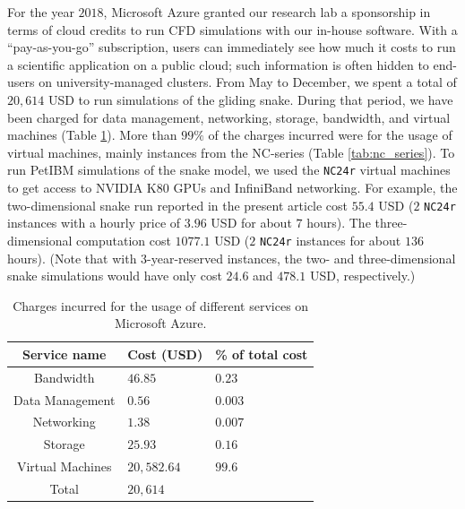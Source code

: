 \documentclass[10pt,journal,compsoc]{IEEEtran}
\begin{document}
For the year $2018$, Microsoft Azure granted our research lab a sponsorship in terms of cloud credits to run CFD simulations with our in-house software.
With a ``pay-as-you-go'' subscription, users can immediately see how much it costs to run a scientific application on a public cloud; such information is often hidden to end-users on university-managed clusters.
From May to December, we spent a total of $20,614$ USD to run simulations of the gliding snake.
During that period, we have been charged for data management, networking, storage, bandwidth, and virtual machines (Table \ref{tab:azure_charges}).
More than $99\%$ of the charges incurred were for the usage of virtual machines, mainly instances from the NC-series (Table \ref{tab:nc_series}).
To run PetIBM simulations of the snake model, we used the \texttt{NC24r} virtual machines to get access to NVIDIA K80 GPUs and InfiniBand networking.
For example, the two-dimensional snake run reported in the present article cost $55.4$ USD ($2$ \texttt{NC24r} instances with a hourly price of $3.96$ USD for about $7$ hours).
The three-dimensional computation cost $1077.1$ USD ($2$ \texttt{NC24r} instances for about $136$ hours).
(Note that with 3-year-reserved instances, the two- and three-dimensional snake simulations would have only cost $24.6$ and $478.1$ USD, respectively.)

\begin{table}
    \renewcommand{\arraystretch}{1.5}
    \caption{Charges incurred for the usage of different services on Microsoft Azure.}
    \label{tab:azure_charges}
    \centering
    \begin{tabular}{cll}
        Service name & Cost (USD) & \% of total cost \\
        \hline
        Bandwidth & $46.85$ & $0.23$ \\
        Data Management & $0.56$ & $0.003$ \\
        Networking & $1.38$ & $0.007$ \\
        Storage & $25.93$ & $0.16$ \\
        Virtual Machines & $20,582.64$& $99.6$ \\
        \hline
        Total & $20,614$ & \\
        \hline
    \end{tabular}
\end{table}
\end{document}
